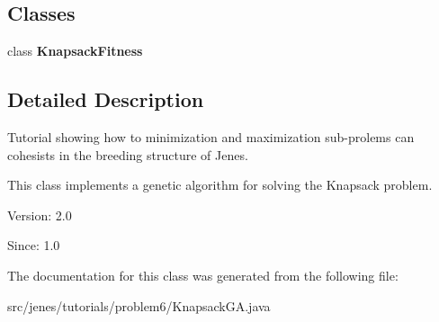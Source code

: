 \subsection*{Classes}
\begin{CompactItemize}
\item 
class \textbf{KnapsackFitness}
\end{CompactItemize}


\subsection{Detailed Description}
Tutorial showing how to minimization and maximization sub-prolems can cohesists in the breeding structure of Jenes.

This class implements a genetic algorithm for solving the Knapsack problem.

\begin{Desc}
\item[Version:]2.0 \end{Desc}
\begin{Desc}
\item[Since:]1.0 \end{Desc}


The documentation for this class was generated from the following file:\begin{CompactItemize}
\item 
src/jenes/tutorials/problem6/KnapsackGA.java\end{CompactItemize}
